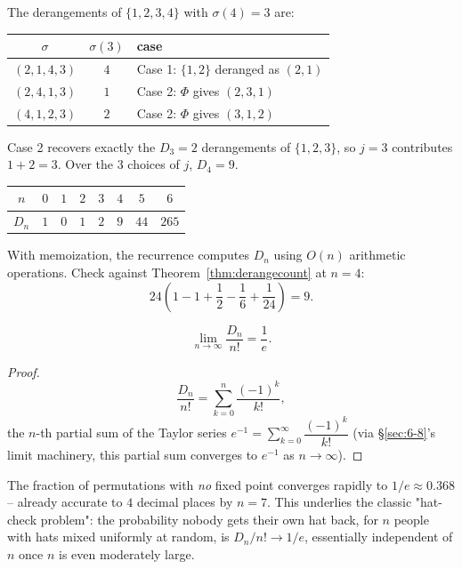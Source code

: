 \documentclass[11pt]{article}
\begin{document}
\begin{example}[The two cases for $n=4$, $j=3$ -- CS70]
The derangements of $\{1,2,3,4\}$ with $\sigma(4)=3$ are:
\begin{center}
\begin{tabular}{c|c|l}
$\sigma$ & $\sigma(3)$ & case \\ \hline
$(2,1,4,3)$ & $4$ & Case 1: $\{1,2\}$ deranged as $(2,1)$ \\
$(2,4,1,3)$ & $1$ & Case 2: $\Phi$ gives $(2,3,1)$ \\
$(4,1,2,3)$ & $2$ & Case 2: $\Phi$ gives $(3,1,2)$
\end{tabular}
\end{center}
Case 2 recovers exactly the $D_3=2$ derangements of $\{1,2,3\}$, so $j=3$ contributes $1+2=3$. Over the $3$ choices of $j$, $D_4=9$.
\end{example}

\begin{example}
\begin{center}
\begin{tabular}{c|ccccccc}
$n$ & $0$ & $1$ & $2$ & $3$ & $4$ & $5$ & $6$ \\ \hline
$D_n$ & $1$ & $0$ & $1$ & $2$ & $9$ & $44$ & $265$
\end{tabular}
\end{center}
With memoization, the recurrence computes $D_n$ using $O(n)$ arithmetic operations. Check against Theorem~\ref{thm:derangecount} at $n=4$:
\[
24\left(1-1+\frac12-\frac16+\frac1{24}\right)=9.
\]
\end{example}

\begin{theorem}
\[
\lim_{n\to\infty} \frac{D_n}{n!} = \frac{1}{e}.
\]
\end{theorem}
\begin{proof}
\[
\frac{D_n}{n!} = \sum_{k=0}^n \frac{(-1)^k}{k!},
\]
the $n$-th partial sum of the Taylor series $e^{-1}=\sum_{k=0}^\infty \dfrac{(-1)^k}{k!}$ (via \S\ref{sec:6-8}'s limit machinery, this partial sum converges to $e^{-1}$ as $n\to\infty$).
\end{proof}

\begin{note}[Interpretation]
The fraction of permutations with \emph{no} fixed point converges rapidly to $1/e\approx0.368$ -- already accurate to $4$ decimal places by $n=7$. This underlies the classic "hat-check problem": the probability nobody gets their own hat back, for $n$ people with hats mixed uniformly at random, is $D_n/n!\to1/e$, essentially independent of $n$ once $n$ is even moderately large.
\end{note}
\end{document}
